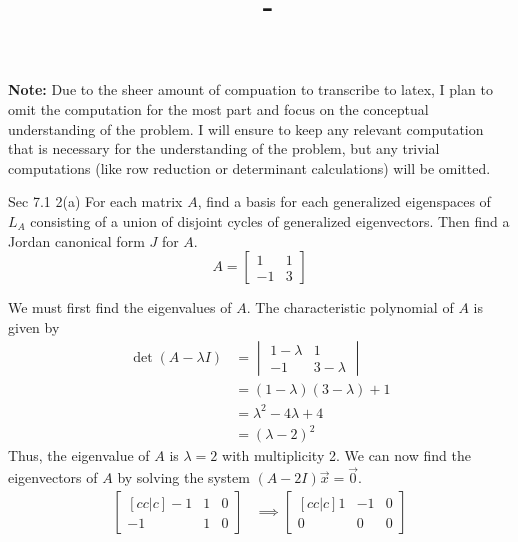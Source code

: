 \documentclass[answers,12pt,addpoints]{exam}
\author{\name}
\title{\course \ - \assignment}
\begin{document}
\maketitle
\textbf{Note:} Due to the sheer amount of compuation to transcribe to latex, I plan to omit the computation for the most part and focus on the conceptual understanding of the problem. I will ensure to keep any relevant computation that is necessary for the understanding of the problem, but any trivial computations (like row reduction or determinant calculations) will be omitted.

\newpage
\begin{questions}
    \question Sec 7.1 2(a)
    For each matrix $A$, find a basis for each generalized eigenspaces of $L_A$ consisting of a union of disjoint cycles of generalized eigenvectors. Then find a Jordan canonical form $J$ for $A$.
    $$A = \begin{bmatrix}
        1 & 1 \\
        -1 & 3
    \end{bmatrix}$$
    \begin{solution}
        We must first find the eigenvalues of $A$. The characteristic polynomial of $A$ is given by
        \begin{align*}
            \det(A - \lambda I) &= \begin{vmatrix}
                1 - \lambda & 1 \\
                -1 & 3 - \lambda
            \end{vmatrix} \\
            &= (1 - \lambda)(3 - \lambda) + 1 \\
            &= \lambda^2 - 4\lambda + 4 \\
            &= (\lambda - 2)^2
        \end{align*}
        Thus, the eigenvalue of $A$ is $\lambda = 2$ with multiplicity 2. We can now find the eigenvectors of $A$ by solving the system $(A - 2I)\vec{x} = \vec{0}$.
        \begin{align*}
            \begin{bmatrix}[cc|c]
                -1 & 1 & 0 \\
                -1 & 1 & 0
            \end{bmatrix}
            &\implies
            \begin{bmatrix}[cc|c]
                1 & -1 & 0 \\
                0 & 0 & 0
            \end{bmatrix}

\end{align*}
\end{solution}
\end{questions}
\end{document}
